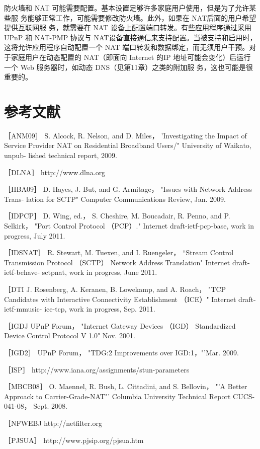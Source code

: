 防火墙和 NAT 可能需要配置。基本设置足够许多家庭用户使用，但是为了允许某些服
务能够正常工作，可能需要修改防火墙。此外，如果在 NAT后面的用户希望提供互联网服
务，就需要在 NAT 设备上配置端口转发。有些应用程序通过采用 UPnP 和 NAT-PMP 协议与
NAT设备直接通信来支持配置。当被支持和启用时，这将允许应用程序自动配置一个 NAT
端口转发和数据绑定，而无须用户干预。对于家庭用户在动态配置的 NAT（即面向 Internet
的IP 地址可能会变化）后运行一个 Web 服务器时，如动态 DNS（见第11章）之类的附加服
务，这也可能是很重要的。

\section{参考文献}

［ANM09］ S. Alcock, R. Nelson, and D. Miles， 'Investigating the Impact of Service
Provider NAT on Residential Broadband Users/" University of Waikato, unpub-
lished technical report, 2009.

［DLNA］ http://www.dlna.org

［HBA09］ D. Hayes, J. But, and G. Armitage， "Issues with Network Address Trans-
lation for SCTP" Computer Communications Review, Jan. 2009.

［IDPCP］ D. Wing, ed.， S. Cheshire, M. Boucadair, R. Penno, and P. Selkirk， "Port
Control Protocol （PCP）." Internet draft-ietf-pcp-base, work in
progress, July 2011.

［IDSNAT］ R. Stewart, M. Tuexen, and I. Ruengeler， “Stream Control Transmission
Protocol （SCTP） Network Address Translation" Internet draft-ietf-behave-
sctpnat, work in progress, June 2011.

［DTI J. Rosenberg, A. Keranen, B. Lowekamp, and A. Roach， "TCP Candidates
with Interactive Connectivity Establishment （ICE）" Internet draft-ietf-mmusic-
ice-tcp, work in progress, Sep. 2011.

［IGDJ UPnP Forum， "Internet Gateway Devices （IGD） Standardized Device
Control Protocol V 1.0" Nov. 2001.

［IGD2］ UPnP Forum， "TDG:2 Improvements over IGD:1，"'Mar. 2009.

［ISP］ http://www.iana.org/assignments/stun-parameters

［MBCB08］ O. Maennel, R. Bush, L. Cittadini, and S. Bellovin， "'A Better Approack
to Carrier-Grade-NAT"' Columbia University Technical Report CUCS-041-08，
Sept. 2008.

［NFWEBJ http://netfilter.org

［PJSUA］ http://www.pjsip.org/pjsua.htm

